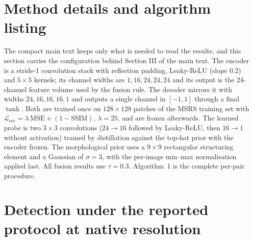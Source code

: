 \documentclass[10pt,a4paper]{article}
\begin{document}
\section{Method details and algorithm listing}
\label{sec:lmethod}

The compact main text keeps only what is needed to read the results, and this section
carries the configuration behind Section III of the main text. The encoder is a stride-1
convolution stack with reflection padding, Leaky-ReLU (slope $0.2$) and $5\times5$
kernels; its channel widths are $1,16,24,24,24$ and its output is the 24-channel
feature volume used by the fusion rule. The decoder mirrors it with widths
$24,16,16,16,1$ and outputs a single channel in $[-1,1]$ through a final $\tanh$. Both
are trained once on $128\times128$ patches of the MSRS training set with
$\mathcal{L}_{\mathrm{rec}}=\lambda\,\mathrm{MSE}+(1-\mathrm{SSIM})$, $\lambda=25$, and
are frozen afterwards. The learned probe is two $3\times3$ convolutions
($24\rightarrow16$ followed by Leaky-ReLU, then $16\rightarrow1$ without activation)
trained by distillation against the top-hat prior with the encoder frozen. The
morphological prior uses a $9\times9$ rectangular structuring element and a Gaussian of
$\sigma=3$, with the per-image min--max normalisation applied last. All fusion results
use $\tau=0.3$. Algorithm~1 is the complete per-pair procedure.

\begin{center}
\end{center}

\section{Detection under the reported protocol at native resolution}
\label{sec:lnative}
\end{document}
